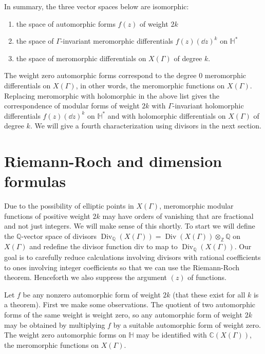\documentclass[11pt,leqno]{article}
\theoremstyle{plain}
\theoremstyle{definition}
\numberwithin{equation}{section}
\numberwithin{lem}{section}
\DeclareMathOperator{\Div}{Div}
\renewcommand{\div}{\text{div}}
\begin{document}
In summary, the three vector spaces below are isomorphic:
\begin{enumerate}
    \item the space of automorphic forms $f(z)$ of weight $2k$
    \item the space of $\Gamma$-invariant meromorphic differentials $f(z)(\dd z)^k$ on $\mathbb H^\ast$
    \item the space of meromorphic differentials on $X(\Gamma)$ of degree $k$.
\end{enumerate}

The weight zero automorphic forms correspond to the degree $0$ meromorphic differentials on $X(\Gamma)$, in other words, the meromorphic functions on $X(\Gamma)$. Replacing meromorphic with holomorphic in the above list gives the correspondence of modular forms of weight $2k$ with $\Gamma$-invariant holomorphic differentials $f(z)(\dd z)^k$ on $\mathbb H^\ast$ and with holomorphic differentials on $X(\Gamma)$ of degree $k$. We will give a fourth characterization using divisors in the next section.



\newpage
\section{Riemann-Roch and dimension formulas}
Due to the possibility of elliptic points in $X(\Gamma)$, meromorphic modular functions of positive weight $2k$ may have orders of vanishing that are fractional and not just integers. We will make sense of this shortly. To start we will define the $\mathbb Q$-vector space of divisors $\Div_{\mathbb Q}(X(\Gamma))=\Div(X(\Gamma))\otimes_{\mathbb Z} \mathbb Q$ on $X(\Gamma)$ and redefine the divisor function $\div$ to map to $\Div_{\mathbb Q}(X(\Gamma))$. Our goal is to carefully reduce calculations involving divisors with rational coefficients to ones involving integer coefficients so that we can use the Riemann-Roch theorem. Henceforth we also suppress the argument $(z)$ of functions.

Let $f$ be any nonzero automorphic form of weight $2k$ (that these exist for all $k$ is a theorem). First we make some observations. The quotient of two automorphic forms of the same weight is weight zero, so any automorphic form of weight $2k$ may be obtained by multiplying $f$ by a suitable automorphic form of weight zero. The weight zero automorphic forms on $\mathbb H$ may be identified with $\mathbb C(X(\Gamma))$, the meromorphic functions on $X(\Gamma)$.
\end{document}
